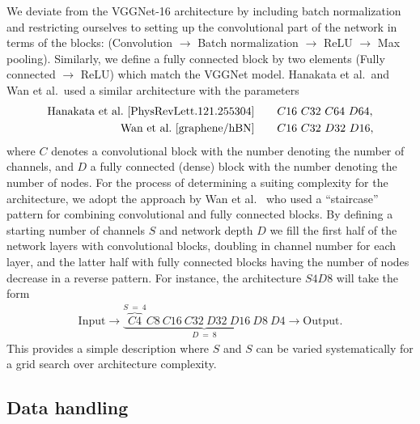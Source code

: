 We deviate from the VGGNet-16 architecture by including batch normalization and restricting ourselves to setting up the convolutional part of the network in terms of the blocks: (Convolution $\to$ Batch normalization $\to$ ReLU $\to$ Max pooling). Similarly, we define a fully connected block by two elements (Fully connected $\to$ ReLU) which match the VGGNet model. Hanakata et al.\ and Wan et al.\ used a similar architecture with the parameters 
\begin{align*}
  \text{Hanakata et al.~\cite{PhysRevLett.121.255304}} & \qquad C16 \ C32 \ C64 \ D64, \\ 
  \text{Wan et al.~\cite{graphene/hBN}} & \qquad C16 \ C32 \ D32 \ D16,
\end{align*}
where $C$ denotes a convolutional block with the number denoting the number of channels, and $D$ a fully connected (dense) block with the number denoting the number of nodes. For the process of determining a suiting complexity for the architecture, we adopt the approach by Wan et al.~\cite{graphene/hBN} who used a ``staircase'' pattern for combining convolutional and fully connected blocks. By defining a starting number of channels $S$ and network depth $D$ we fill the first half of the network layers with convolutional blocks, doubling in channel number for each layer, and the latter half with fully connected blocks having the number of nodes decrease in a reverse pattern. For instance, the architecture $S4D8$ will take the form
\begin{align*}
  \text{Input} \to \underbrace{\overbrace{C4}^{S \ = \ 4}C8 \ C16 \ C32 \ D32 \ D16 \ D8 \ D4}_{D \ = \ 8} \to \text{Output}.
\end{align*} 
This provides a simple description where $S$ and $S$ can be varied systematically for a grid search over architecture complexity. 


\subsection{Data handling}
